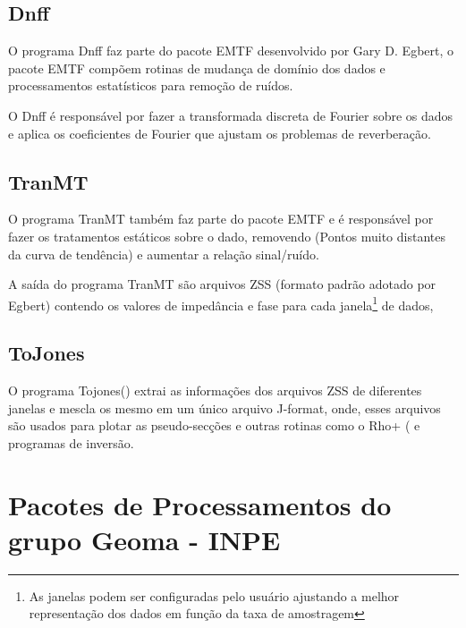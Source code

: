     
    \subsection{Dnff}
    
            O programa Dnff faz parte do pacote EMTF  desenvolvido por Gary D. Egbert, o pacote EMTF compõem rotinas de mudança de domínio dos dados e processamentos estatísticos para remoção de ruídos.
            
            O Dnff é responsável por fazer a transformada discreta de Fourier sobre os dados e aplica os coeficientes de Fourier  que ajustam os problemas de reverberação.

    \subsection{TranMT}
    
            O programa TranMT também faz parte do pacote EMTF e é responsável por fazer os tratamentos estáticos sobre o dado, removendo  (Pontos muito distantes da curva de tendência) e aumentar a relação sinal/ruído.
            
            A saída do programa TranMT são arquivos ZSS (formato padrão adotado por Egbert) contendo os valores de impedância e fase para cada janela\footnote{As janelas podem ser configuradas pelo usuário ajustando a melhor representação dos dados em função da taxa de amostragem} de dados,   
            
            
    \subsection{ToJones}
    
            O programa Tojones() extrai as informações dos arquivos ZSS de diferentes janelas e mescla os mesmo em um único arquivo J-format, onde, esses arquivos são usados para plotar as pseudo-secções e outras rotinas como o Rho+ ( e programas de inversão.
            
    \section{Pacotes de Processamentos do grupo Geoma - INPE}
    
